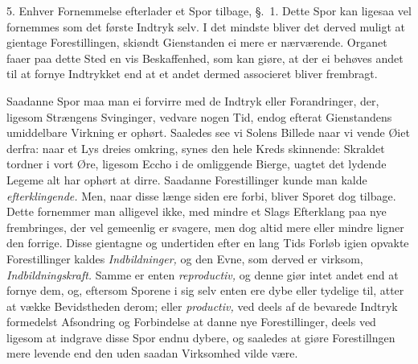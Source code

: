 \documentclass[12pt,a4paper]{article}
\newcommand{\opage}[1]{\marginnote{\footnotesize\textit{[#1]}}}
\begin{document}
5. Enhver Fornemmelse efterlader et Spor tilbage, §.~1. Dette Spor kan ligesaa vel
fornemmes som det første Indtryk selv. I det mindste bliver det derved muligt at gientage
Forestillingen, skiøndt Gienstanden ei mere er nærværende. Organet faaer paa dette Sted
\opage{105} en vis Beskaffenhed, som kan giøre, at der ei behøves andet til at fornye Indtrykket end
at et andet dermed associeret bliver frembragt.

Saadanne Spor maa man ei forvirre med de Indtryk eller Forandringer, der, ligesom
Strængens Svinginger, vedvare nogen Tid, endog efterat Gienstandens umiddelbare Virkning
er ophørt. Saaledes see vi Solens Billede naar vi vende Øiet derfra: naar et Lys dreies
omkring, synes den hele Kreds skinnende: Skraldet tordner i vort Øre, ligesom Eccho i de
omliggende Bierge, uagtet det lydende Legeme alt har ophørt at dirre. Saadanne
Forestillinger kunde man kalde \emph{efterklingende.} Men, naar disse længe siden ere
forbi, bliver Sporet dog tilbage. Dette fornemmer man alligevel ikke, med mindre et Slags
Efterklang paa nye frembringes, der vel gemeenlig er svagere, men dog altid mere eller
mindre ligner den forrige. Disse gientagne og undertiden efter en lang Tids Forløb igien
opvakte Forestillinger kaldes \emph{Indbildninger,} og den Evne, som derved er virksom,
\emph{Indbildningskraft.} Samme er enten \emph{reproductiv,} og denne giør intet andet
end at fornye dem, og, eftersom Sporene i sig selv enten ere dybe eller tydelige til,
atter at vække Bevidstheden derom; eller \emph{productiv,} ved deels af de bevarede
Indtryk formedelst Afsondring og Forbindelse at danne nye Forestillinger, deels ved
ligesom at indgrave disse Spor endnu dybere, og
\opage{106} saaledes at giøre Forestillngen mere levende end den uden saadan Virksomhed vilde være.
\end{document}
